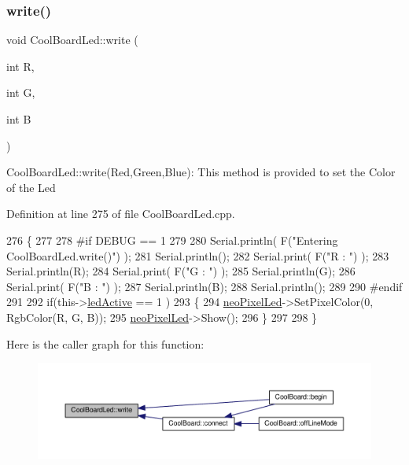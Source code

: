 \subsubsection{\texorpdfstring{write()}{write()}}
{\footnotesize\ttfamily void Cool\+Board\+Led\+::write (\begin{DoxyParamCaption}\item[{int}]{R,  }\item[{int}]{G,  }\item[{int}]{B }\end{DoxyParamCaption})}

Cool\+Board\+Led\+::write(\+Red,\+Green,\+Blue)\+: This method is provided to set the Color of the Led 

Definition at line 275 of file Cool\+Board\+Led.\+cpp.


\begin{DoxyCode}
276 \{
277 
278 \textcolor{preprocessor}{#if DEBUG == 1}
279 
280     Serial.println( F(\textcolor{stringliteral}{"Entering CoolBoardLed.write()"}) );
281     Serial.println();
282     Serial.print( F(\textcolor{stringliteral}{"R : "}) );
283     Serial.println(R);
284     Serial.print( F(\textcolor{stringliteral}{"G : "}) );
285     Serial.println(G);
286     Serial.print( F(\textcolor{stringliteral}{"B : "}) );
287     Serial.println(B);
288     Serial.println();   
289 
290 \textcolor{preprocessor}{#endif}
291 
292     \textcolor{keywordflow}{if}(this->\hyperlink{class_cool_board_led_aadd04d2ecf123247718d77f42fba7f08}{ledActive} == 1 )
293     \{
294         \hyperlink{class_cool_board_led_ac2c13fa462a010cd9242bf297c013923}{neoPixelLed}->SetPixelColor(0, RgbColor(R, G, B));
295         \hyperlink{class_cool_board_led_ac2c13fa462a010cd9242bf297c013923}{neoPixelLed}->Show();
296     \}
297 
298 \}
\end{DoxyCode}
Here is the caller graph for this function\+:\nopagebreak
\begin{figure}[H]
\begin{center}
\leavevmode
\includegraphics[width=350pt]{de/dc0/class_cool_board_led_a30fadd4cbec17ceea428bf7a32207e87_icgraph}
\end{center}
\end{figure}


